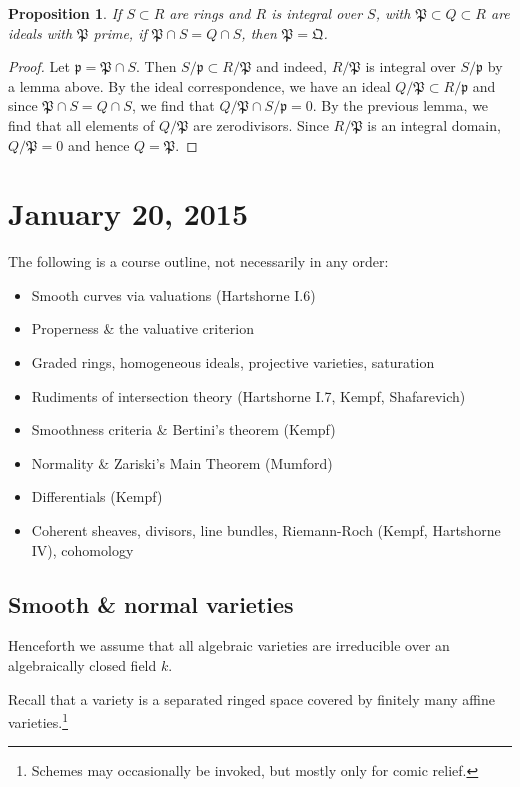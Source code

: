 \documentclass{article}
\newcommand{\fr}{\mathfrak}
\theoremstyle{plain}
\newtheorem{prop}[thm]{Proposition}
\theoremstyle{definition}
\theoremstyle{remark}
\begin{document}
\begin{prop}
    If $S\subset R$ are rings and $R$ is integral over $S$, with $\fr P\subset Q\subset R$
    are ideals with $\fr P$ prime, if $\fr P\cap S=Q\cap S$, then $\fr P=\fr Q$.
\end{prop}
\begin{proof}
    Let $\fr p=\fr P\cap S$. Then $S/\fr p\subset R/\fr P$ and indeed, $R/\fr P$ is integral
    over $S/\fr p$ by a lemma above. By the ideal correspondence, we have an ideal
    $Q/\fr P\subset R/\fr p$ and since $\fr P\cap S=Q\cap S$, we find that $Q/\fr P\cap S/\fr p=0$.
    By the previous lemma, we find that all elements of $Q/\fr P$ are zerodivisors. Since
    $R/\fr P$ is an integral domain, $Q/\fr P=0$ and hence $Q=\fr P$.
\end{proof}

\section*{January 20, 2015}

The following is a course outline, not necessarily in any order:
\begin{itemize}
    \item Smooth curves via valuations (Hartshorne I.6)
    \item Properness \& the valuative criterion
    \item Graded rings, homogeneous ideals, projective varieties, saturation
    \item Rudiments of intersection theory (Hartshorne I.7, Kempf, Shafarevich)
    \item Smoothness criteria \& Bertini's theorem (Kempf)
    \item Normality \& Zariski's Main Theorem (Mumford)
    \item Differentials (Kempf)
    \item Coherent sheaves, divisors, line bundles, Riemann-Roch (Kempf, Hartshorne IV), cohomology
\end{itemize}

\subsection{Smooth \& normal varieties}

Henceforth we assume that all algebraic varieties are irreducible over an
algebraically closed field $k$.

Recall that a variety is a separated ringed space covered by finitely
many affine varieties.\footnote{Schemes may occasionally be invoked, but mostly
only for comic relief.}
\end{document}
